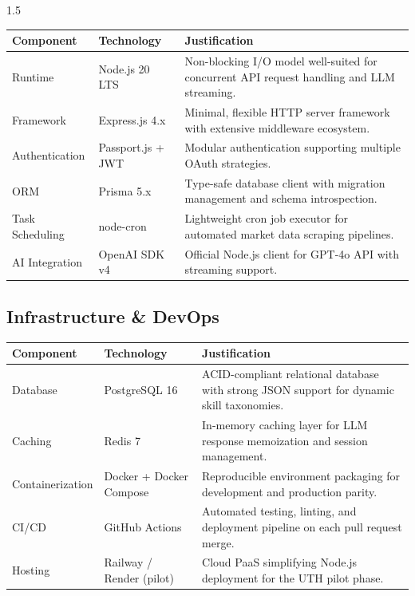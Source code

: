 \documentclass[12pt,a4paper]{report}
\begin{document}
\begin{spacing}{1.5}
		\begin{longtable}{|p{3cm}|p{4cm}|p{8cm}|}
			\hline
			\rowcolor{gray!20}\textbf{Component} & \textbf{Technology} & \textbf{Justification} \\ \hline
			Runtime & Node.js 20 LTS & Non-blocking I/O model well-suited for concurrent API request handling and LLM streaming. \\ \hline
			Framework & Express.js 4.x & Minimal, flexible HTTP server framework with extensive middleware ecosystem. \\ \hline
			Authentication & Passport.js + JWT & Modular authentication supporting multiple OAuth strategies. \\ \hline
			ORM & Prisma 5.x & Type-safe database client with migration management and schema introspection. \\ \hline
			Task Scheduling & node-cron & Lightweight cron job executor for automated market data scraping pipelines. \\ \hline
			AI Integration & OpenAI SDK v4 & Official Node.js client for GPT-4o API with streaming support. \\ \hline
		\end{longtable}
		
		\subsection{Infrastructure \& DevOps}
		
		\begin{longtable}{|p{3cm}|p{4cm}|p{8cm}|}
			\hline
			\rowcolor{gray!20}\textbf{Component} & \textbf{Technology} & \textbf{Justification} \\ \hline
			Database & PostgreSQL 16 & ACID-compliant relational database with strong JSON support for dynamic skill taxonomies. \\ \hline
			Caching & Redis 7 & In-memory caching layer for LLM response memoization and session management. \\ \hline
			Containerization & Docker + Docker Compose & Reproducible environment packaging for development and production parity. \\ \hline
			CI/CD & GitHub Actions & Automated testing, linting, and deployment pipeline on each pull request merge. \\ \hline
			Hosting & Railway / Render (pilot) & Cloud PaaS simplifying Node.js deployment for the UTH pilot phase. \\ \hline
		\end{longtable}
		

\end{spacing}
\end{document}
